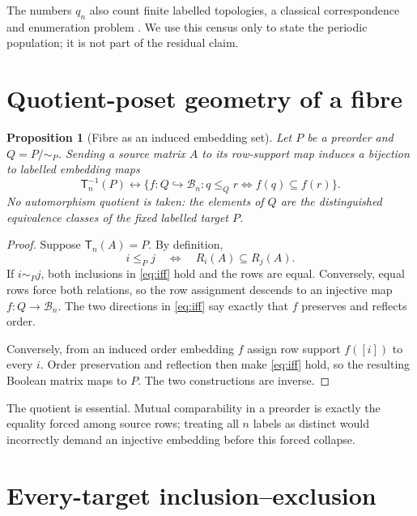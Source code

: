 \documentclass[10pt,a4paper]{amsart}
\newtheorem{proposition}[theorem]{Proposition}
\theoremstyle{definition}
\theoremstyle{remark}
\newcommand{\B}{\mathcal B}
\newcommand{\T}{\mathsf T}
\begin{document}
The numbers $q_n$ also count finite labelled topologies, a classical
correspondence and enumeration problem \cite{ErneStege1991}.  We use this
census only to state the periodic population; it is not part of the residual
claim.

\section{Quotient-poset geometry of a fibre}

\begin{proposition}[Fibre as an induced embedding set]\label{prop:embedding}
Let $P$ be a preorder and $Q=P/{\sim_P}$.  Sending a source matrix $A$ to
its row-support map induces a bijection to labelled embedding maps
\begin{equation}\label{eq:bijection}
 \T_n^{-1}(P)
 \longleftrightarrow
 \{f:Q\hookrightarrow\B_n:
       q\le_Qr\Longleftrightarrow f(q)\subseteq f(r)\}.
\end{equation}
No automorphism quotient is taken: the elements of $Q$ are the distinguished
equivalence classes of the fixed labelled target $P$.
\end{proposition}

\begin{proof}
Suppose $\T_n(A)=P$.  By definition,
\begin{equation}\label{eq:iff}
 i\le_Pj\quad\Longleftrightarrow\quad R_i(A)\subseteq R_j(A).
\end{equation}
If $i\sim_Pj$, both inclusions in \eqref{eq:iff} hold and the rows are
equal.  Conversely, equal rows force both relations, so the row assignment
descends to an injective map $f:Q\to\B_n$.  The two directions in
\eqref{eq:iff} say exactly that $f$ preserves and reflects order.

Conversely, from an induced order embedding $f$ assign row support $f([i])$
to every $i$.  Order preservation and reflection then make
\eqref{eq:iff} hold, so the resulting Boolean matrix maps to $P$.  The two
constructions are inverse.
\end{proof}

The quotient is essential.  Mutual comparability in a preorder is exactly
the equality forced among source rows; treating all $n$ labels as distinct
would incorrectly demand an injective embedding before this forced collapse.

\section{Every-target inclusion--exclusion}
\end{document}
